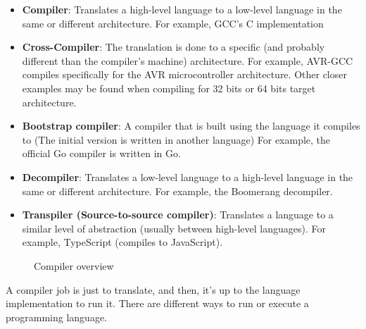 \begin{itemize}
    \item \textbf{Compiler}: Translates a high-level language to a low-level language in the same or different architecture.
        For example, GCC's C implementation
    \item \textbf{Cross-Compiler}: The translation is done to a specific (and probably different than the compiler's machine) architecture.
        For example, AVR-GCC compiles specifically for the AVR microcontroller architecture. Other closer examples may be found when compiling for
        32 bits or 64 bits target architecture.
    \item \textbf{Bootstrap compiler}: A compiler that is built using the language it compiles to (The initial version is written in another language)
        For example, the official Go compiler is written in Go.
    \item \textbf{Decompiler}: Translates a low-level language to a high-level language in the same or different architecture.
        For example, the Boomerang decompiler.
    \item \textbf{Transpiler (Source-to-source compiler)}: Translates a language to a similar level of abstraction (usually between high-level languages).
        For example, TypeScript (compiles to JavaScript).
\end{itemize}

\begin{figure}[H]
    \centering

    \caption{Compiler overview}
    \label{fig:compiler_overview}
\end{figure}

A compiler job is just to translate, and then, it's up to the language implementation to run it. There are different ways to
run or execute a programming language.

